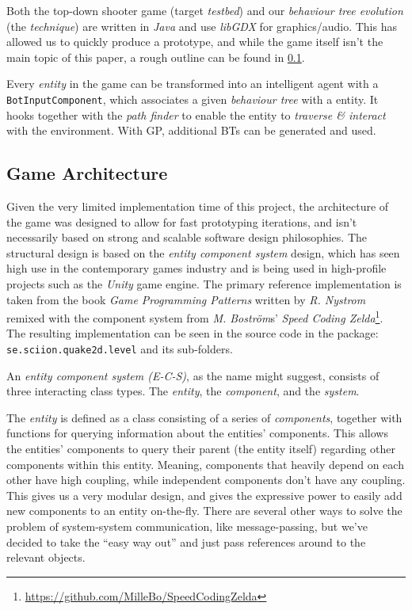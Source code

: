 \documentclass[a4paper, twocolumn]{article}
\begin{document}
        Both the top-down shooter game (target \emph{testbed}) and our \emph{behaviour tree evolution} (the \emph{technique}) are written in \emph{Java} and use \emph{libGDX} for graphics/audio. This has allowed us to quickly produce a prototype, and while the game itself isn't the main topic of this paper, a rough outline can be found in \cref{sec:game_architecture}.

        Every \emph{entity} in the game can be transformed into an intelligent agent with a \texttt{BotInputComponent}, which associates a given \emph{behaviour tree} with a entity. It hooks together with the \emph{path finder} to enable the entity to \emph{traverse \& interact} with the environment. With GP, additional BTs can be generated and used.

        \subsection{Game Architecture} \label{sec:game_architecture}

        Given the very limited implementation time of this project, the architecture of the game was designed to allow for fast prototyping iterations, and isn't necessarily based on strong and scalable software design philosophies. The structural design is based on the \textit{entity component system} design, which has seen high use in the contemporary games industry and is being used in high-profile projects such as the \textit{Unity} game engine. The primary reference implementation is taken from the book \textit{Game Programming Patterns} written by \textit{R. Nystrom}~\cite{nystrom2014game} remixed with the component system from \textit{M. Boström}s' \textit{Speed Coding Zelda}\footnote{\url{https://github.com/MilleBo/SpeedCodingZelda}}. The resulting implementation can be seen in the source code in the package: \texttt{se.sciion.quake2d.level} and its sub-folders.

        An \textit{entity component system (E-C-S)}, as the name might suggest, consists of three interacting class types. The \textit{entity}, the \textit{component}, and the \textit{system}.

        The \emph{entity} is defined as a class consisting of a series of \emph{components}, together with functions for querying information about the entities' components. This allows the entities' components to query their parent (the entity itself) regarding other components within this entity. Meaning, components that heavily depend on each other have high coupling, while independent components don't have any coupling. This gives us a very modular design, and gives the expressive power to easily add new components to an entity on-the-fly. There are several other ways to solve the problem of system-system communication, like message-passing, but we've decided to take the ``easy way out'' and just pass references around to the relevant objects.
\end{document}
